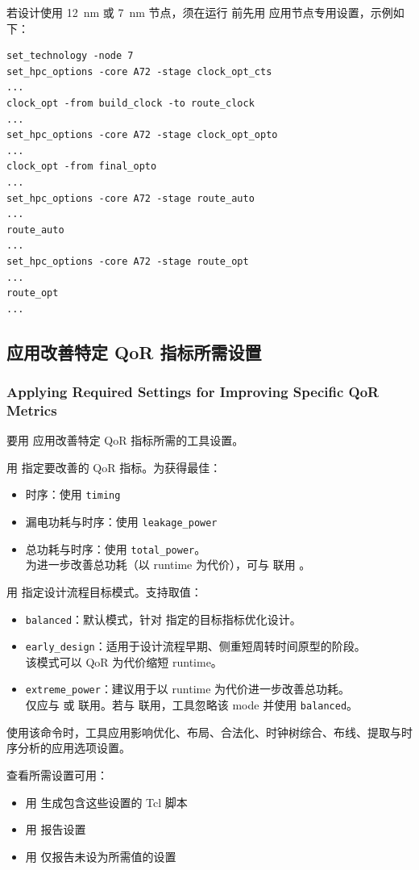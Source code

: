 若设计使用 12~nm 或 7~nm 节点，须在运行  前先用  应用节点专用设置，示例如下：
\begin{lstlisting}
set_technology -node 7
set_hpc_options -core A72 -stage clock_opt_cts
...
clock_opt -from build_clock -to route_clock
...
set_hpc_options -core A72 -stage clock_opt_opto
...
clock_opt -from final_opto
...
set_hpc_options -core A72 -stage route_auto
...
route_auto
...
set_hpc_options -core A72 -stage route_opt
...
route_opt
...
\end{lstlisting}

\subsection{应用改善特定 QoR 指标所需设置}
\subsubsection*{Applying Required Settings for Improving Specific QoR Metrics}

要用  应用改善特定 QoR 指标所需的工具设置。

用  指定要改善的 QoR 指标。为获得最佳：
\begin{itemize}
  \item 时序：使用 \texttt{timing}
  \item 漏电功耗与时序：使用 \texttt{leakage\_power}
  \item 总功耗与时序：使用 \texttt{total\_power}。\\
        为进一步改善总功耗（以 runtime 为代价），可与  联用 。
\end{itemize}

用  指定设计流程目标模式。支持取值：
\begin{itemize}
  \item \texttt{balanced}：默认模式，针对  指定的目标指标优化设计。
  \item \texttt{early\_design}：适用于设计流程早期、侧重短周转时间原型的阶段。\\
        该模式可以 QoR 为代价缩短 runtime。
  \item \texttt{extreme\_power}：建议用于以 runtime 为代价进一步改善总功耗。\\
        仅应与  或  联用。若与  联用，工具忽略该 mode 并使用 \texttt{balanced}。
\end{itemize}

使用该命令时，工具应用影响优化、布局、合法化、时钟树综合、布线、提取与时序分析的应用选项设置。

查看所需设置可用：
\begin{itemize}
  \item 用  生成包含这些设置的 Tcl 脚本
  \item 用  报告设置
  \item 用  仅报告未设为所需值的设置
\end{itemize}

